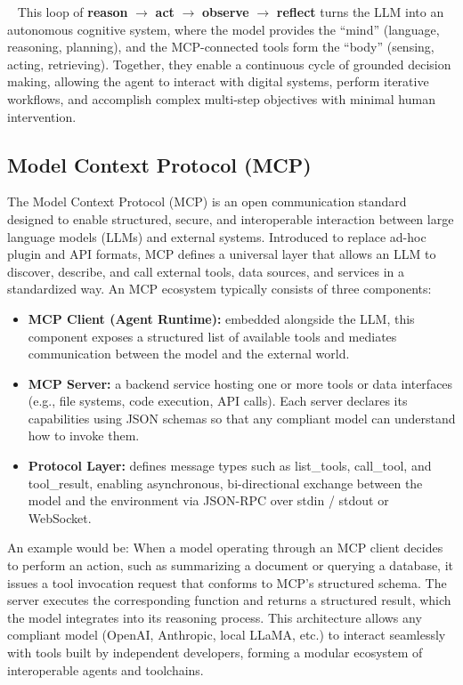 \documentclass[11pt]{article}  %
\begin{document}
\textbullet~ This loop of \textbf{reason} $\rightarrow$ \textbf{act} $\rightarrow$ \textbf{observe} $\rightarrow$ \textbf{reflect} turns the LLM into an autonomous cognitive system, where the model provides the ``mind'' (language, reasoning, planning), and the MCP-connected tools form the ``body'' (sensing, acting, retrieving).
Together, they enable a continuous cycle of grounded decision making, allowing the agent to interact with digital systems, perform iterative workflows, and accomplish complex multi-step objectives with minimal human intervention.


\subsection{Model Context Protocol (MCP)}
The Model Context Protocol (MCP) is an open communication standard designed to enable structured, secure, and interoperable interaction between large language models (LLMs) and external systems.
Introduced to replace ad-hoc plugin and API formats, MCP defines a universal layer that allows an LLM to discover, describe, and call external tools, data sources, and services in a standardized way.
An MCP ecosystem typically consists of three components:

\begin{itemize}
  \item \textbf{MCP Client (Agent Runtime):} embedded alongside the LLM, this component exposes a structured list of available tools and mediates communication between the model and the external world.
  
  \item \textbf{MCP Server:} a backend service hosting one or more tools or data interfaces (e.g., file systems, code execution, API calls). 
  Each server declares its capabilities using JSON schemas so that any compliant model can understand how to invoke them.

  \item \textbf{Protocol Layer:} defines message types such as list\_tools, call\_tool, and tool\_result, enabling asynchronous, bi-directional exchange between the model and the environment via JSON-RPC over stdin / stdout or WebSocket.
\end{itemize}

An example would be: When a model operating through an MCP client decides to perform an action, such as summarizing a document or querying a database, it issues a tool invocation request that conforms to MCP's structured schema.
The server executes the corresponding function and returns a structured result, which the model integrates into its reasoning process.
This architecture allows any compliant model (OpenAI, Anthropic, local LLaMA, etc.) to interact seamlessly with tools built by independent developers, forming a modular ecosystem of interoperable agents and toolchains.
\end{document}
